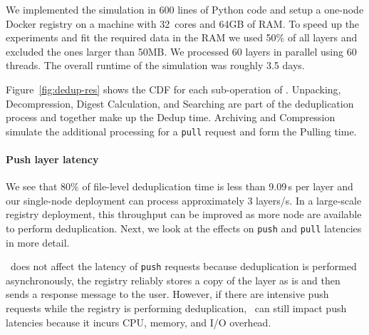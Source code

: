 We implemented the simulation in 600 lines of Python code
and setup a one-node Docker registry on a machine with 32~cores and 64GB of RAM.
%
To speed up the experiments and fit the required data in the RAM
we used 50\% of all layers and excluded the ones larger than 50MB.
%
We processed 60 layers in parallel using 60 threads.
%
The overall runtime of the simulation was roughly 3.5 days.
%

Figure~\ref{fig:dedup-res} shows the CDF for each sub-operation of
\sysname.
%
Unpacking, Decompression, Digest Calculation, and Searching 
are part of
the deduplication process and together make up the Dedup time.
%
%
Archiving and Compression simulate the additional processing for a \texttt{pull}
request and form the Pulling time.
%

%
%
%
%

\paragraph{Push layer latency}

We see that 80\% of file-level deduplication time is less than 9.09\,s per layer
and our single-node deployment can process approximately 3 layers/s.
%
In a large-scale registry deployment, this throughput can be improved
as more node are available to perform deduplication.
%
%
Next, we look at the effects on \texttt{push} and \texttt{pull}
latencies in more detail.


\sysname\ does not affect the latency of
\texttt{push} requests because deduplication is performed asynchronously, \ie
the registry reliably stores a copy of the layer as is and then sends a
response message to the user.
%
However, if there are intensive push requests while the registry is performing
deduplication, \sysname\ can still impact push latencies because it incurs CPU,
memory, and I/O overhead. %

